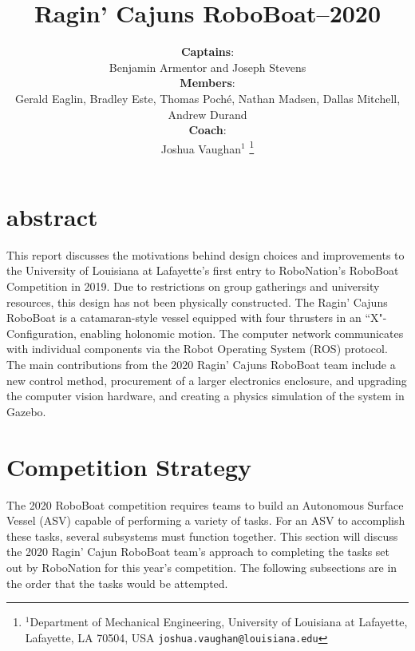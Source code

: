 \documentclass[letterpaper, 10 pt, conference]{ieeeconf}
\title{\LARGE \bf Ragin' Cajuns RoboBoat--2020}
\author{\textbf{Captains}:\\Benjamin Armentor and Joseph Stevens\\
\textbf{Members}:\\Gerald Eaglin, Bradley Este, Thomas Poché, Nathan Madsen, Dallas Mitchell, Andrew Durand\\
\textbf{Coach}:\\Joshua Vaughan$^{1}$%
\thanks{$^{1}$Department of Mechanical Engineering,
        University of Louisiana at Lafayette, Lafayette, LA 70504, USA
        {\tt\small joshua.vaughan@louisiana.edu}}%
}
\begin{document}
\maketitle
\thispagestyle{empty}
\section{abstract}
This report discusses the motivations behind design choices and improvements to the University of Louisiana at Lafayette's first entry to RoboNation's RoboBoat Competition in 2019. Due to restrictions on group gatherings and university resources, this design has not been physically constructed.  The Ragin' Cajuns RoboBoat is a catamaran-style vessel equipped with four thrusters in an ``X"-Configuration, enabling holonomic motion. The computer network communicates with individual components via the Robot Operating System (ROS) protocol. The main contributions from the 2020 Ragin' Cajuns RoboBoat team include a new control method, procurement of a larger electronics enclosure, and upgrading the computer vision hardware, and creating a physics simulation of the system in Gazebo.
\section{Competition Strategy}
The 2020 RoboBoat competition requires teams to build an Autonomous Surface Vessel (ASV) capable of performing a variety of tasks. For an ASV to accomplish these tasks, several subsystems must function together. This section will discuss the 2020 Ragin' Cajun RoboBoat team's approach to completing the tasks set out by RoboNation for this year's competition. The following subsections are in the order that the tasks would be attempted.
\end{document}
